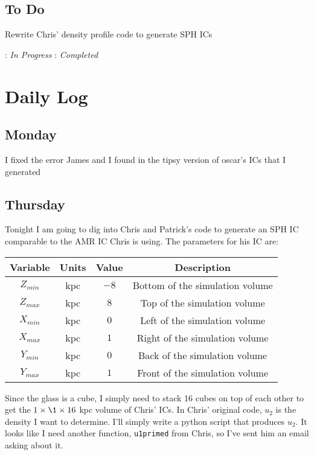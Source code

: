 \documentclass[11pt,letterpaper]{article}
\begin{document}
\subsection*{To Do}
\begin{bullets}
\item Rewrite Chris' density profile code to generate SPH ICs
\end{bullets}

\textleaf : \textit{In Progress} \qquad \checkmark : \textit{Completed}

\section*{Daily Log}
\subsection*{Monday}
I fixed the error James and I found in the tipsy version of oscar's ICs that I
generated
\subsection*{Thursday}
Tonight I am going to dig into Chris and Patrick's code to generate an SPH IC
comparable to the AMR IC Chris is using.  The parameters for his IC are:\\
\center
\begin{tabular}{| c | c | c | c |}
\hline
Variable & Units & Value & Description\\
\hline
$Z_{min}$ & kpc & $-8$ & Bottom of the simulation volume\\
$Z_{max}$ & kpc & $8$ & Top of the simulation volume\\
$X_{min}$ & kpc & $0$ & Left of the simulation volume\\
$X_{max}$ & kpc & $1$ & Right of the simulation volume\\
$Y_{min}$ & kpc & $0$ & Back of the simulation volume\\
$Y_{max}$ & kpc & $1$ & Front of the simulation volume\\
\hline
\end{tabular}
Since the glass is a cube, I simply need to stack 16 cubes on top of each other
to get the $1\times\1\times16$ kpc volume of Chris' ICs.  In Chris' original 
code, $u_2$ is the density I want to determine.  I'll simply write a python 
script that produces $u_2$.  It looks like I need another function, 
\verb!u1primed! from Chris, so I've sent him an email asking about it.
\end{document}
